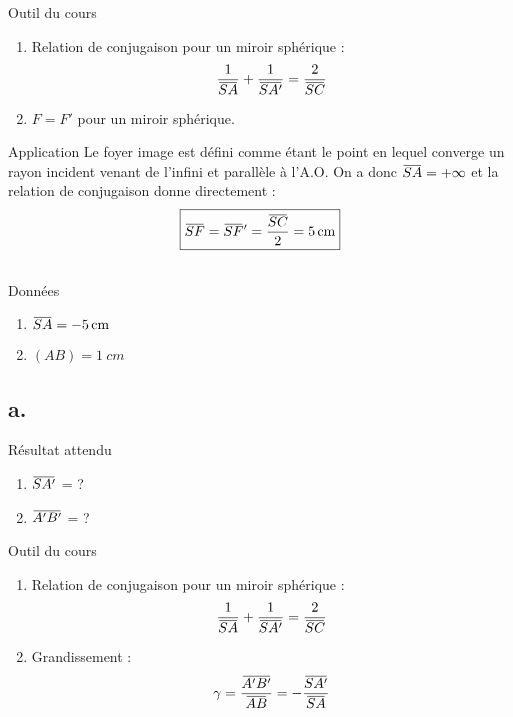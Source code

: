\documentclass[10pt,a5paper,notitlepage]{book}
\begin{document}
\begin{NCdemo}{Outil du cours}
    \begin{enumerate}
        \item Relation de conjugaison pour un miroir sphérique :
            \[ \frac{1}{\SA} + \frac{1}{\SAp} = \frac{2}{\SC} \]
        \item $F = F'$ pour un miroir sphérique.
    \end{enumerate}
\end{NCdemo}

\begin{NCexem}{Application}
    Le foyer image est défini comme étant le point en lequel converge un rayon
    incident venant de l'infini et parallèle à l'A.O. On a donc $\SA = +\infty$
    et la relation de conjugaison donne directement :
    \[ \boxed{\SF = \SF' = \frac{\SC}{2} = \SI{5}{cm}} \]
\end{NCexem}

\subsection{}
\begin{NCdefi}{Données}
    \begin{enumerate}
        \item $\SA = \SI{-5}{cm}$
        \item $(AB) = \SI{1}{cm}$
    \end{enumerate}
\end{NCdefi}

\setcounter{subsection}{1}
\subsection{a.}
\begin{NCprop}{Résultat attendu}
    \begin{enumerate}
        \item $\SAp$ = ?
        \item $\ABp$ = ?
    \end{enumerate}
\end{NCprop}

\begin{NCdemo}{Outil du cours}
    \begin{enumerate}
        \item Relation de conjugaison pour un miroir sphérique :
            \[ \frac{1}{\SA} + \frac{1}{\SAp} = \frac{2}{\SC} \]
        \item Grandissement :
            \[ \g = \frac{\ABp}{\ABb} = - \frac{\SAp}{\SA} \]
    \end{enumerate}
    
\end{NCdemo}
\end{document}
